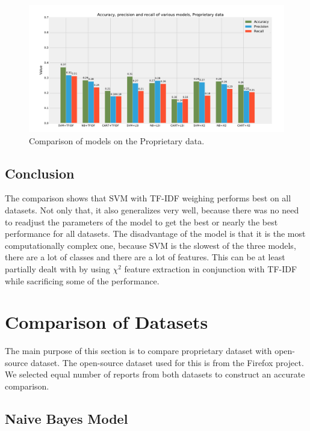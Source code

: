 \begin{figure}[htbp]
    \centering
        \includegraphics[width=\textwidth]{./images/comparison_of_models/proprietary.pdf}
    \caption{Comparison of models on the Proprietary data.}
    \label{fig:results.models.proprietary}
\end{figure}

\subsection{Conclusion}

The comparison shows that SVM with TF-IDF weighing performs best on all datasets. Not only that, it also generalizes very well, because there was no need to readjust the parameters of the model to get the best or nearly the best performance for all datasets. The disadvantage of the model is that it is the most computationally complex one, because SVM is the slowest of the three models, there are a lot of classes and there are a lot of features. This can be at least partially dealt with by using $\chi^2$ feature extraction in conjunction with TF-IDF while sacrificing some of the performance.

\section{Comparison of Datasets}
\label{section:comparison-of-datasets}

The main purpose of this section is to compare proprietary dataset with open-source dataset. The open-source dataset used for this is from the Firefox project. We selected equal number of reports from both datasets to construct an accurate comparison.

\subsection{Naive Bayes Model}

